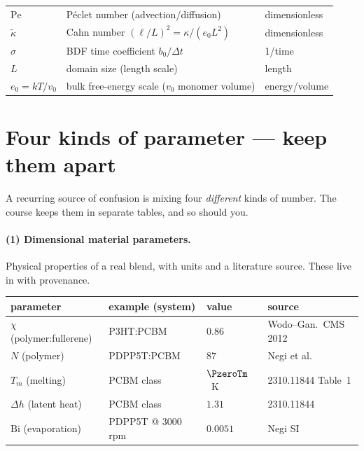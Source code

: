 \begin{center}
\begin{tabular}{lll}
$\mathrm{Pe}$   & P\'eclet number (advection/diffusion) & dimensionless \\
$\tilde\kappa$  & Cahn number $(\ell/L)^2=\kappa/(e_0L^2)$ & dimensionless \\
$\sigma$        & BDF time coefficient $b_0/\Delta t$ & 1/time \\
$L$             & domain size (length scale) & length \\
$e_0=kT/v_0$    & bulk free-energy scale ($v_0$ monomer volume) & energy/volume \\
\bottomrule
\end{tabular}
\end{center}

\section{Four kinds of parameter --- keep them apart}

A recurring source of confusion is mixing four \emph{different} kinds of
number. The course keeps them in separate tables, and so should you.

\paragraph{(1) Dimensional material parameters.} Physical properties of a
real blend, with units and a literature source. These live in
 with provenance.
\begin{center}\small
\begin{tabular}{llll}
\toprule
parameter & example (system) & value & source \\
\midrule
$\chi$ (polymer:fullerene) & P3HT:PCBM & $0.86$ & Wodo--Gan.\ CMS 2012 \\
$N$ (polymer) & PDPP5T:PCBM & $87$ & Negi et al.\ \\
$T_m$ (melting) & PCBM class & $\PzeroTm$~K & 2310.11844 Table~1 \\
$\Delta h$ (latent heat) & PCBM class & $1.31$ & 2310.11844 \\
$\mathrm{Bi}$ (evaporation) & PDPP5T @ 3000 rpm & $0.0051$ & Negi SI \\
\bottomrule
\end{tabular}
\end{center}

